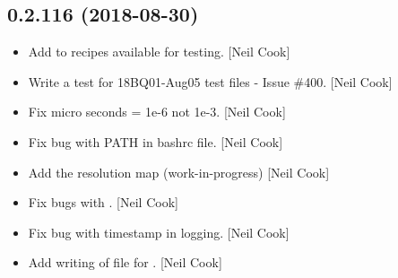 \documentclass[a4paper,10pt,english]{report}
\begin{document}
\subsection{0.2.116 (2018-08-30)}
\label{\detokenize{misc/changelog:id345}}\begin{itemize}
\item {} 
Add  to recipes available for testing. {[}Neil
Cook{]}

\item {} 
Write a test for 18BQ01-Aug05 test files  - Issue
\#400. {[}Neil Cook{]}

\item {} 
Fix micro seconds = 1e-6 not 1e-3. {[}Neil Cook{]}

\item {} 
Fix bug with PATH in bashrc file. {[}Neil Cook{]}

\item {} 
Add the resolution map (work-in-progress) {[}Neil Cook{]}

\item {} 
Fix bugs with . {[}Neil Cook{]}

\item {} 
Fix bug with timestamp in logging. {[}Neil Cook{]}

\item {} 
Add writing of file for . {[}Neil Cook{]}

\end{itemize}
\end{document}
